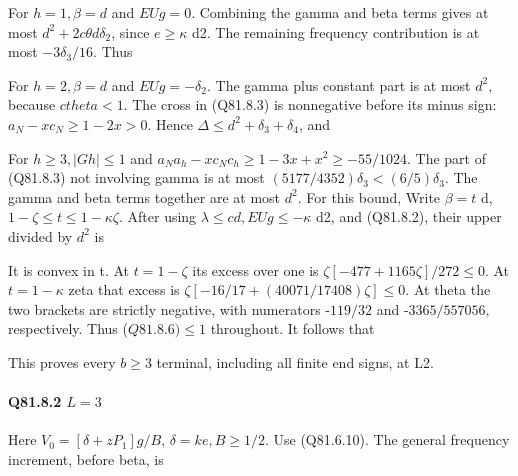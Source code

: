 
For \(h=1,\allowbreak  \beta=d\) and \(EUg=0.\) Combining the gamma and beta terms
gives at most \(d^2+2c\theta d \delta_2\), since \(e\ge \kappa\) d2.
The remaining frequency contribution is at most \(-3\delta_3/16\).
Thus


For \(h=2,\allowbreak  \beta=d\) and \(EUg=-\delta_2.\) The gamma plus constant part is
at most \(d^2,\allowbreak \) because \(ctheta<1.\) The cross in (Q81.8.3) is nonnegative
before its minus sign: \(a_N-xc_N\ge1-2x>0\). Hence
\(\Delta\le d^2+\delta_3+\delta_4\), and


For \(h\ge 3,\allowbreak  |Gh|\le 1\) and
\(a_Na_h-xc_Nc_h\ge1-3x+x^2\ge-55/1024\).
The part of (Q81.8.3) not involving gamma is at most
\((5177/4352)\delta_3<(6/5)\delta_3\).
The gamma and beta terms together are at most \(d^2.\) For this bound, Write \(\beta=t\) d,
\(1-\zeta\le t\le1-\kappa\zeta\). After using \(\lambda\le cd,\allowbreak  EUg\le -\kappa\) d2, and (Q81.8.2), their upper divided by \(d^2\) is


It is convex in t. At \(t=1-\zeta\) its excess over one is
\(\zeta[-477+1165\zeta]/272\le0\).
At \(t=1-\kappa\) zeta that excess is
\(\zeta[-16/17+(40071/17408)\zeta]\le0\).
At theta the two brackets are strictly negative, with numerators
-\(119/32\) and -\(3365/557056,\allowbreak \) respectively. Thus (\(Q81.8.6)\le 1\) throughout.
It follows that


This proves every \(b\ge 3\) terminal, including all finite end signs, at L2.

\paragraph{Q81.8.2 \(L=3\)}

Here \(V_0=[\delta+zP_1]g/B\), \(\delta=ke,\allowbreak  B\ge 1/2.\)
Use (Q81.6.10). The general frequency increment, before beta, is


